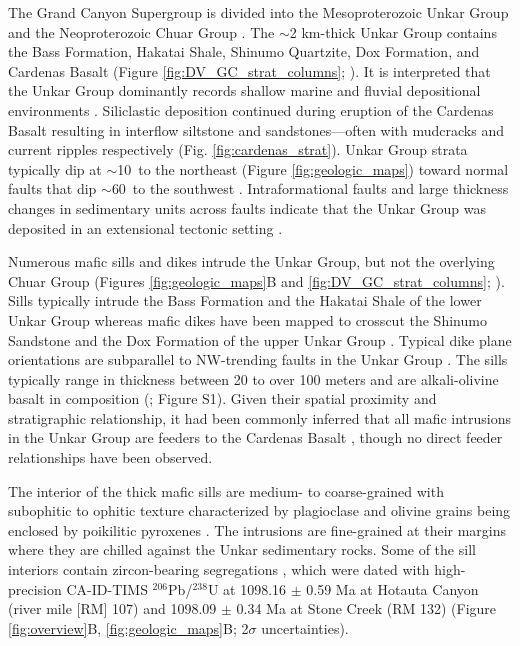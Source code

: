 The Grand Canyon Supergroup is divided into the Mesoproterozoic Unkar Group and the Neoproterozoic Chuar Group \citep{Gundy1951a, Elston1989a, Dehler2017a}. The $\sim$2 km-thick Unkar Group contains the Bass Formation, Hakatai Shale, Shinumo Quartzite, Dox Formation, and Cardenas Basalt (Figure \ref{fig:DV_GC_strat_columns}; \cite{Beus1974a, Elston1989a}). It is interpreted that the Unkar Group dominantly records shallow marine and fluvial depositional environments \citep{Elston1989a, Sears1990a, Hendricks1989a, Timmons2005a}. Siliclastic deposition continued during eruption of the Cardenas Basalt resulting in interflow siltstone and sandstones---often with mudcracks and current ripples respectively  (Fig. \ref{fig:cardenas_strat}). Unkar Group strata typically dip at $\sim$10\textdegree\ to the northeast (Figure \ref{fig:geologic_maps}) toward normal faults that dip $\sim$60\textdegree\ to the southwest \citep{Sears1973a, Timmons2012a}. Intraformational faults and large thickness changes in sedimentary units across faults indicate that the Unkar Group was deposited in an extensional tectonic setting \citep{Sears1990a, Karlstrom1998a, Timmons2001a}. 

Numerous mafic sills and dikes intrude the Unkar Group, but not the overlying Chuar Group (Figures \ref{fig:geologic_maps}B and \ref{fig:DV_GC_strat_columns}; \cite{Elston1989a}). Sills typically intrude the Bass Formation and the Hakatai Shale of the lower Unkar Group \citep{Hendricks1989a} whereas mafic dikes have been mapped to crosscut the Shinumo Sandstone and the Dox Formation of the upper Unkar Group \citep{Timmons2012a}. Typical dike plane orientations are subparallel to NW-trending faults in the Unkar Group \citep{Huntoon1996a, Timmons2012a}. The sills typically range in thickness between 20 to over 100 meters and are alkali-olivine basalt in composition (\cite{Hendricks1989a, Larson1994a}; Figure S1). Given their spatial proximity and stratigraphic relationship, it had been commonly inferred that all mafic intrusions in the Unkar Group are feeders to the Cardenas Basalt \cite[e.g.][]{Huntoon1996a, Timmons2012a}, though no direct feeder relationships have been observed.

The interior of the thick mafic sills are medium- to coarse-grained with subophitic to ophitic texture characterized by plagioclase and olivine grains being enclosed by poikilitic pyroxenes \citep{Hendricks1989a}. The intrusions are fine-grained at their margins where they are chilled against the Unkar sedimentary rocks.  Some of the sill interiors contain zircon-bearing segregations \citep{Mohr2024a}, which were dated with high-precision CA-ID-TIMS $^{206}$Pb/$^{238}$U at 1098.16 $\pm$ 0.59 Ma at Hotauta Canyon (river mile [RM] 107) and 1098.09 $\pm$ 0.34 Ma at Stone Creek (RM 132) (Figure \ref{fig:overview}B, \ref{fig:geologic_maps}B; 2$\sigma$ uncertainties). 

